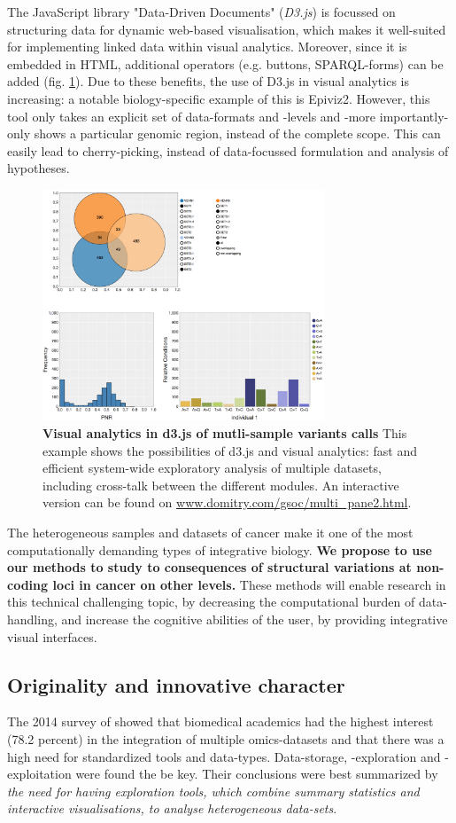 \documentclass[twoside,fontsize=12pt]{article}
\begin{document}
The JavaScript library "Data-Driven Documents" (\textit{D3.js}) is focussed on structuring data for dynamic web-based visualisation, which makes it well-suited for implementing linked data within visual analytics\cite{Bostock2011}. Moreover, since it is embedded in HTML, additional operators (e.g. buttons, SPARQL-forms) can be added (fig. \ref{fig:nya}). Due to these benefits, the use of D3.js in visual analytics is increasing: a notable biology-specific example of this is Epiviz2\cite{Chelaru2014}. However, this tool only takes an explicit set of data-formats and -levels and -more importantly- only shows a particular genomic region, instead of the complete scope. This can easily lead to cherry-picking, instead of data-focussed formulation and analysis of hypotheses.
\medskip
\begin{figure}[H]
    \centering
    \includegraphics[width=0.75\textwidth]{nyeplot}
    \caption{\textbf{Visual analytics in d3.js of mutli-sample variants calls} This example shows the possibilities of d3.js and visual analytics: fast and efficient system-wide exploratory analysis of multiple datasets, including cross-talk between the different modules. An interactive version can be found on \url{www.domitry.com/gsoc/multi_pane2.html}.}
    \label{fig:nya}
\end{figure}
\noindent 
The heterogeneous samples and datasets of cancer make it one of the most computationally demanding types of integrative biology. \textbf{We propose to use our methods to study to consequences of structural variations at non-coding loci in cancer on other levels.}  These methods will enable research in this technical challenging topic, by decreasing the computational burden of data-handling, and increase the cognitive abilities of the user, by providing integrative visual interfaces. 
\newpage\subsection*{Originality and innovative character} 
The 2014 survey of \citet{Gomez-Cabrero2014} showed that biomedical academics had the highest interest (78.2 percent) in the integration of multiple omics-datasets and that there was a high need for standardized tools and data-types. Data-storage, -exploration and -exploitation were found the be key. Their conclusions were best summarized by \textit{the need for having exploration tools, which combine summary statistics and interactive visualisations, to analyse heterogeneous data-sets}.
\medskip
\end{document}
